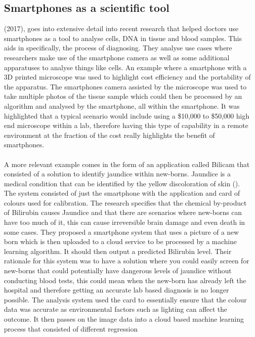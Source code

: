 \documentclass{article}
\begin{document}
\subsection{Smartphones as a scientific tool}
\citeauthor{wright2017} (2017),  goes into extensive detail into recent research that helped doctors use smartphones as a tool to analyse 
cells, DNA in tissue and blood samples. This aids in specifically, the process of diagnosing. They analyse use cases 
where researchers make use of the smartphone camera as well as some additional apparatuses to analyse things like cells.
 An example where a smartphone with a 3D printed microscope was used to highlight cost efficiency and the portability of
  the apparatus. The smartphones camera assisted by the microscope was used to take multiple photos of the tissue sample
   which could then be processed by an algorithm and analysed by the smartphone, all within the smartphone. It was 
   highlighted that a typical scenario would include using a \$10,000 to \$50,000 high end microscope within a lab, 
   therefore having this type of capability in a remote environment at the fraction of the cost really highlights the 
   benefit of smartphones.
\\
\\
A more relevant example comes in the form of an application called Bilicam that consisted of a solution to identify 
jaundice within new-borns. Jaundice is a medical condition that can be identified by the yellow discoloration of skin 
(\cite{deGreefLilian2014Bump}). The system consisted of just the smartphone with the application and card of colours used for 
calibration. The research specifies that the chemical by-product of Bilirubin causes Jaundice and that there are 
scenarios where new-borns can have too much of it, this can cause irreversible brain damage and even death in some 
cases. They proposed a smartphone system that uses a picture of a new born which is then uploaded to a cloud service 
to be processed by a machine learning algorithm. It should then output a predicted Bilirubin level. Their rationale for 
this system was to have a solution where you could easily screen for new-borns that could potentially have dangerous 
levels of jaundice without conducting blood tests, this could mean when the new-born has already left the hospital and 
therefore getting an accurate lab based diagnosis is no longer possible. The analysis system used the card to 
essentially ensure that the colour data was accurate as environmental factors such as lighting can affect the outcome. 
It then passes on the image data into a cloud based machine learning process that consisted of different regression 
\end{document}

